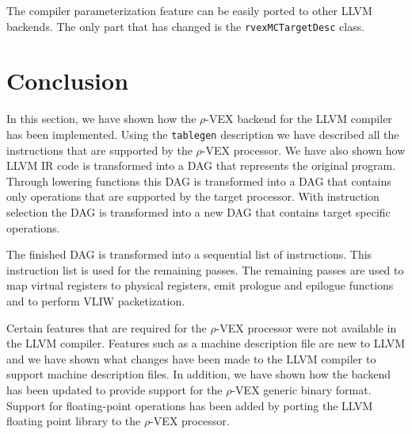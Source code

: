 The compiler parameterization feature can be easily ported to other LLVM backends. The only part that has changed is the \texttt{rvexMCTargetDesc} class. 

\section{Conclusion}
In this section, we have shown how the $\rho$-VEX backend for the LLVM compiler has been implemented. Using the \texttt{tablegen} description we have described all the instructions that are supported by the $\rho$-VEX processor. We have also shown how LLVM IR code is transformed into a DAG that represents the original program. Through lowering functions this DAG is transformed into a DAG that contains only operations that are supported by the target processor. With instruction selection the DAG is transformed into a new DAG that contains target specific operations.

The finished DAG is transformed into a sequential list of instructions. This instruction list is used for the remaining passes. The remaining passes are used to map virtual registers to physical registers, emit prologue and epilogue functions and to perform VLIW packetization.

Certain features that are required for the $\rho$-VEX processor were not available in the LLVM compiler. Features such as a machine description file are new to LLVM and we have shown what changes have been made to the LLVM compiler to support machine description files. In addition, we have shown how the backend has been updated to provide support for the $\rho$-VEX generic binary format. Support for floating-point operations has been added by porting the LLVM floating point library to the $\rho$-VEX processor.


\acresetall

